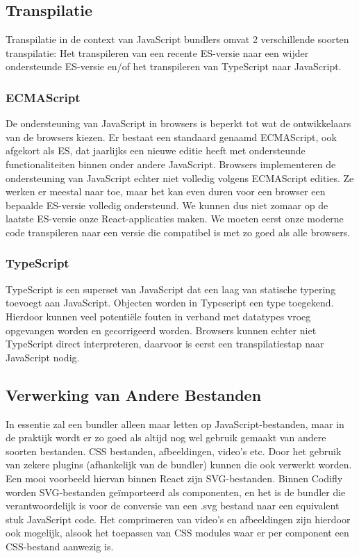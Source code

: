 \subsection{Transpilatie}

Transpilatie in de context van JavaScript bundlers omvat 2 verschillende soorten transpilatie: Het transpileren van een recente ES-versie naar een wijder ondersteunde ES-versie en/of het transpileren van TypeScript naar JavaScript.

\subsubsection{ECMAScript}

De ondersteuning van JavaScript in browsers is beperkt tot wat de ontwikkelaars van de browsers kiezen. Er bestaat een standaard genaamd ECMAScript, ook afgekort als ES, dat jaarlijks een nieuwe editie heeft met ondersteunde functionaliteiten binnen onder andere JavaScript. Browsers implementeren de ondersteuning van JavaScript echter niet volledig volgens ECMAScript edities. Ze werken er meestal naar toe, maar het kan even duren voor een browser een bepaalde ES-versie volledig ondersteund. We kunnen dus niet zomaar op de laatste ES-versie onze React-applicaties maken. We moeten eerst onze moderne code transpileren naar een versie die compatibel is met zo goed als alle browsers.

\subsubsection{TypeScript}

TypeScript is een superset van JavaScript dat een laag van statische typering toevoegt aan JavaScript. Objecten worden in Typescript een type toegekend. Hierdoor kunnen veel potentiële fouten in verband met datatypes vroeg opgevangen worden en gecorrigeerd worden. Browsers kunnen echter niet TypeScript direct interpreteren, daarvoor is eerst een transpilatiestap naar JavaScript nodig.

\subsection{Verwerking van Andere Bestanden}

In essentie zal een bundler alleen maar letten op JavaScript-bestanden, maar in de praktijk wordt er zo goed als altijd nog wel gebruik gemaakt van andere soorten bestanden. CSS bestanden, afbeeldingen, video's etc. Door het gebruik van zekere plugins (afhankelijk van de bundler) kunnen die ook verwerkt worden. Een mooi voorbeeld hiervan binnen React zijn SVG-bestanden. Binnen Codifly worden SVG-bestanden geïmporteerd als componenten, en het is de bundler die verantwoordelijk is voor de conversie van een .svg bestand naar een equivalent stuk JavaScript code. Het comprimeren van video's en afbeeldingen zijn hierdoor ook mogelijk, alsook het toepassen van CSS modules waar er per component een CSS-bestand aanwezig is.

